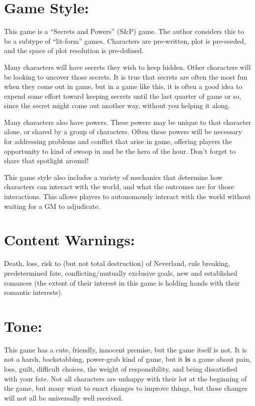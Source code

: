 \documentclass[sheet]{PP}
\begin{document}

\section*{Game Style:}
This game is a “Secrets and Powers” (S\&P) game. The author considers this to be a subtype of “lit-form” games. Characters are pre-written, plot is pre-seeded, and the space of plot resolution is pre-defined. 

Many characters will have secrets they wish to keep hidden. Other characters will be looking to uncover those secrets. It is true that secrets are often the most fun when they come out in game, but in a game like this, it is often a good idea to expend some effort toward keeping secrets until the last quarter of game or so, since the secret might come out another way, without you helping it along.

Many characters also have powers. These powers may be unique to that character alone, or shared by a group of characters. Often these powers will be necessary for addressing problems and conflict that arise in game, offering players the opportunity to kind of swoop in and be the hero of the hour. Don’t forget to share that spotlight around!

This game style also includes a variety of mechanics that determine how characters can interact with the world, and what the outcomes are for those interactions. This allows players to autonomously interact with the world without waiting for a GM to adjudicate.


\section*{Content Warnings:}
Death, loss, risk to (but not total destruction) of Neverland, rule breaking, predetermined fate, conflicting/mutually exclusive goals, new and established romances (the extent of their interest in this game is holding hands with their romantic interests).

\section*{Tone:}
This game has a cute, friendly, innocent premise, but the game itself is not. It is not a harsh, backstabbing, power-grab kind of game, but it \textbf{is} a game about pain, loss, guilt, difficult choices, the weight of responsibility, and being dissatisfied with your fate. Not all characters are unhappy with their lot at the beginning of the game, but many want to enact changes to improve things, but those changes will not all be universally well received.
\end{document}
